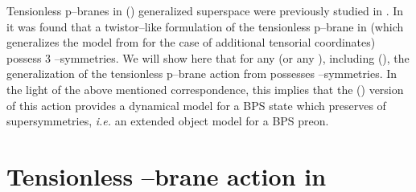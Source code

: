 \documentclass[a4paper,11pt]{article}
\begin{document}
Tensionless p--branes in \coordHE{} (\coordHE{}) generalized superspace 
 \coordHE{} were previously  
studied in \cite{ZL,ZU}. In \cite{ZU} it was found that a  
twistor--like formulation of the tensionless p--brane   
in \coordHE{} (which generalizes the model from \cite{BZ} 
for the case of additional tensorial coordinates) 
possess 3 \myHighlight{$\kappa$}\coordHE{}--symmetries. 
We will show here that for any \coordHE{} (or any \coordHE{}), including \coordHE{} (\coordHE{}), 
the \coordHE{} generalization of the tensionless p--brane 
action from \cite{BZ} possesses \coordHE{}  \myHighlight{$\kappa$}\coordHE{}--symmetries. 
In the light of the above mentioned correspondence, this implies that  
the \coordHE{} (\coordHE{}) version of this action 
provides a dynamical model for a BPS state which preserves  
\coordHE{} of \coordHE{} supersymmetries, {\it i.e.} an extended object model for 
a BPS preon. 



\section{Tensionless \coordHE{}--brane action in \coordHE{}}
 
\end{document}
